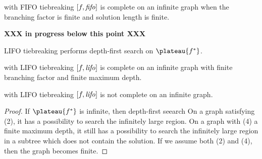 \begin{propo}
 \astar with FIFO tiebreaking $[f,{\text{\textit{fifo}}}]$ is complete on an infinite graph when the branching factor is finite and solution length is finite.
\end{propo}


{\bf XXX in progress below this point XXX}

LIFO tiebreaking performs depth-first search on $\plateau{f^*}$.



\begin{propo} %
 \astar with LIFO tiebreaking $[f,{\text{\textit{lifo}}}]$ is complete on an infinite graph with finite branching factor and finite maximum depth.
\end{propo}

\begin{propo} %
 \astar with LIFO tiebreaking $[f,{\text{\textit{lifo}}}]$ is not complete on an infinite graph.
\end{propo}
\begin{proof}
 If $\plateau{f^*}$ is infinite, then depth-first seearch 
 On a graph satisfying (2), it has a possibility to search the infinitely large region.
 On a graph with (4) a finite maximum depth,
 it still has a possibility to search the infinitely large region in a subtree
 which does not contain the solution.
 If we assume both (2) and (4), then the graph becomes finite.
\end{proof}

